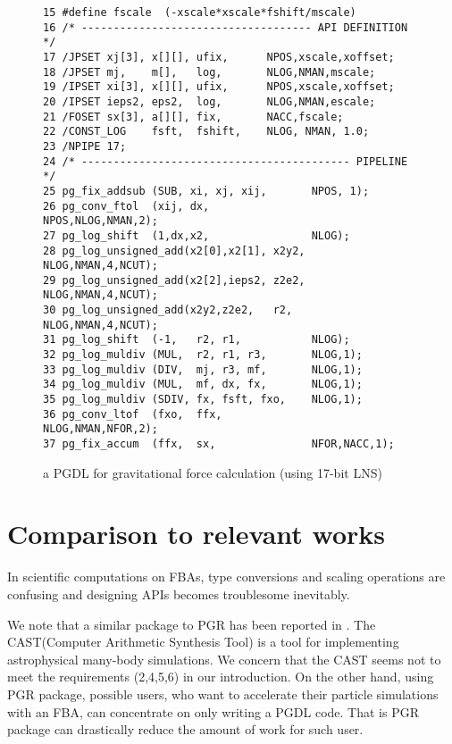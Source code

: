 \documentclass{llncs}
\begin{document}
\begin{figure}[htb]
\begin{center}
\begin{minipage}{.45\linewidth}
{\begin{verbatim}
15 #define fscale  (-xscale*xscale*fshift/mscale)
16 /* ------------------------------------ API DEFINITION */
17 /JPSET xj[3], x[][], ufix,      NPOS,xscale,xoffset;
18 /JPSET mj,    m[],   log,       NLOG,NMAN,mscale;
19 /IPSET xi[3], x[][], ufix,      NPOS,xscale,xoffset;
20 /IPSET ieps2, eps2,  log,       NLOG,NMAN,escale;
21 /FOSET sx[3], a[][], fix,       NACC,fscale;
22 /CONST_LOG    fsft,  fshift,    NLOG, NMAN, 1.0;
23 /NPIPE 17;
24 /* ------------------------------------------ PIPELINE */
25 pg_fix_addsub (SUB, xi, xj, xij,       NPOS, 1);
26 pg_conv_ftol  (xij, dx,                NPOS,NLOG,NMAN,2);
27 pg_log_shift  (1,dx,x2,                NLOG);
28 pg_log_unsigned_add(x2[0],x2[1], x2y2, NLOG,NMAN,4,NCUT);
29 pg_log_unsigned_add(x2[2],ieps2, z2e2, NLOG,NMAN,4,NCUT);
30 pg_log_unsigned_add(x2y2,z2e2,   r2,   NLOG,NMAN,4,NCUT);
31 pg_log_shift  (-1,   r2, r1,           NLOG);
32 pg_log_muldiv (MUL,  r2, r1, r3,       NLOG,1);
33 pg_log_muldiv (DIV,  mj, r3, mf,       NLOG,1);
34 pg_log_muldiv (MUL,  mf, dx, fx,       NLOG,1);
35 pg_log_muldiv (SDIV, fx, fsft, fxo,    NLOG,1);
36 pg_conv_ltof  (fxo,  ffx,              NLOG,NMAN,NFOR,2);
37 pg_fix_accum  (ffx,  sx,               NFOR,NACC,1);
\end{verbatim}
}
\caption{a PGDL for gravitational force calculation (using 17-bit LNS)}
\label{figgrav5_pgdl}
    \end{minipage}
  \end{center}
\end{figure}


\section{Comparison to relevant works}
In scientific computations on FBAs,
type conversions and scaling operations are confusing and
designing APIs becomes troublesome inevitably.

We note that a similar package to PGR has been reported in
\cite{THYL04}.  The CAST(Computer Arithmetic Synthesis Tool) is a tool
for implementing astrophysical many-body simulations.  We concern that
the CAST seems not to meet the requirements (2,4,5,6) in our introduction.
On the other hand, using PGR package, possible users, 
who want to accelerate their particle simulations with an FBA,
can concentrate on only writing a PGDL code.
That is PGR package can drastically reduce the amount of work for such user.


\end{document}
